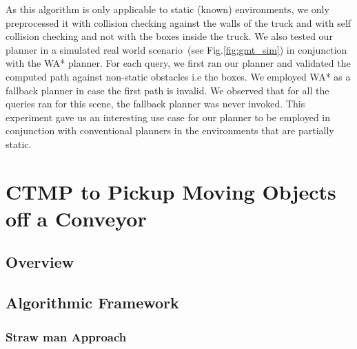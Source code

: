 \documentclass[a4paper,10pt]{article}
\begin{document}
\begin{table}[t]
\centering
     \resizebox{0.7\columnwidth}{!}{%
        \begin{tabular}{ l | c c c c}  
           & arm & nose & arm+base & nose+base\\
         \hline
         WA* 		& 12.8 & 7.2 & 7.5 & 4.4 \\
         Our Method & 0.69 & 0.29 & 0.5 & 0.47 \\
        \end{tabular}
    }
    \caption{Comparison of mean planning times~[ms] averaged over 100 randomized queries for different modes of operation of the truck-unloading robot. The number of subregions preprocessed for each of these modes~(left to right) are~101,~7,~85 and~308.}
    \label{tab:gmt}
\end{table}

As this algorithm is only applicable to static (known) environments, we only preprocessed it with collision checking against the walls of the truck and with self collision checking and not with the boxes inside the truck. We also tested our planner in a simulated real world scenario~(see Fig.\ref{fig:gmt_sim}) in conjunction with the WA* planner. For each query, we first ran our planner and validated the computed path against non-static obstacles i.e the boxes. We employed WA* as a fallback planner in case the first path is invalid. We observed that for all the queries ran for this scene, the fallback planner was never invoked. This experiment gave us an interesting use case for our planner to be employed in conjunction with conventional planners in the environments that are partially static.

\section{CTMP to Pickup Moving Objects off a Conveyor}
\label{sec:conveyor}
\subsection{Overview}
\subsection{Algorithmic Framework}
\subsubsection{Straw man Approach}
\end{document}
